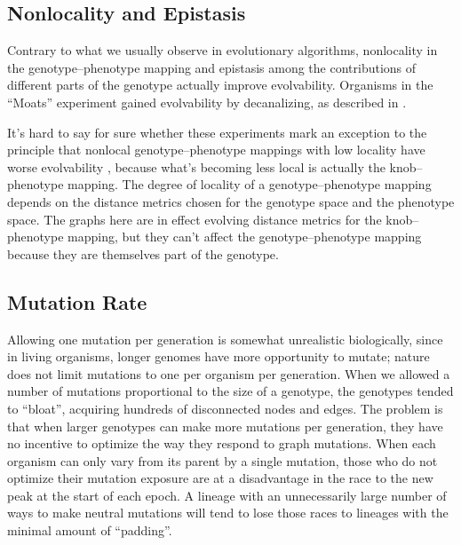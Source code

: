\documentclass[letterpaper]{article}
\begin{document}

\subsection{Nonlocality and Epistasis}

Contrary to what we usually observe in evolutionary algorithms, nonlocality in
the genotype--phenotype mapping and epistasis among the contributions of
different parts of the genotype actually improve evolvability. Organisms in
the ``Moats'' experiment gained evolvability by decanalizing, as described in
\citet{hansen2006evolution}.

It's hard to say for sure whether these experiments mark an exception to the
principle that nonlocal genotype--phenotype mappings with low locality have
worse evolvability \citep{rothlauf2006locality}, because what's becoming less
local is actually the knob--phenotype mapping. The degree of locality of a
genotype--phenotype mapping depends on the distance metrics chosen for the
genotype space and the phenotype space. The graphs here are in effect evolving
distance metrics for the knob--phenotype mapping, but they can't affect the
genotype--phenotype mapping because they are themselves part of the genotype.

\subsection{Mutation Rate}

Allowing one mutation per generation is somewhat unrealistic biologically,
since in living organisms, longer genomes have more opportunity to mutate;
nature does not limit mutations to one per organism per generation. When we
allowed a number of mutations proportional to the size of a genotype, the
genotypes tended to ``bloat'', acquiring hundreds of disconnected nodes and
edges. The problem is that when larger genotypes can make more mutations per
generation, they have no incentive to optimize the way they respond to graph
mutations.  When each organism can only vary from its parent by a single
mutation, those who do not optimize their mutation exposure are at a
disadvantage in the race to the new peak at the start of each epoch. A lineage
with an unnecessarily large number of ways to make neutral mutations will tend
to lose those races to lineages with the minimal amount of ``padding''.
\end{document}
